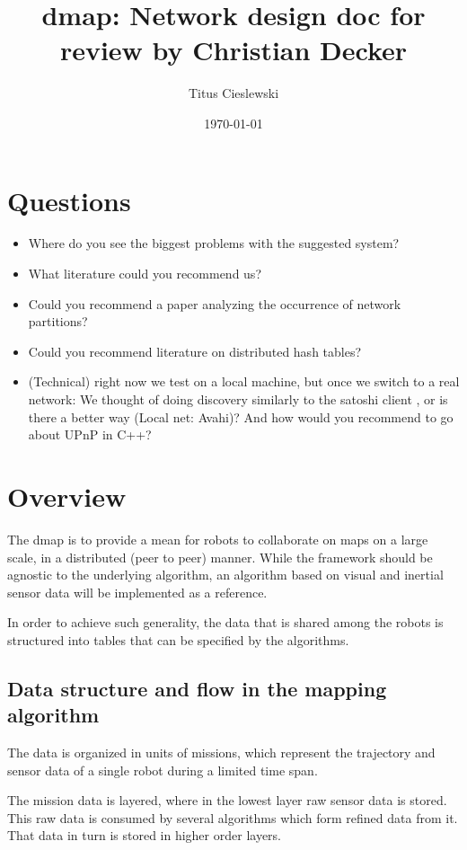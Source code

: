 \documentclass[a4paper, 10pt, conference]{ieeeconf}
\title{dmap: Network design doc for review by Christian Decker}
\author{Titus Cieslewski}
\date{\today}
\begin{document}
\maketitle

\section{Questions}

\begin{itemize}
  \itemsep0em
  \item Where do you see the biggest problems with the suggested system?
  \item What literature could you recommend us?
  \item Could you recommend a paper analyzing the occurrence of network
    partitions?
  \item Could you recommend literature on distributed hash tables?
  \item (Technical) right now we test on a local machine, but once we switch to
    a real network: We thought of doing discovery similarly to the satoshi
    client \cite{discovery}, or is there a better way (Local net: Avahi)? 
    And how would you recommend to go about UPnP in C++?
\end{itemize}

\section{Overview}

The dmap is to provide a mean for robots to collaborate on maps on a large
scale, in a distributed (peer to peer) manner. While the framework should be
agnostic to the underlying algorithm, an algorithm based on visual and inertial
sensor data will be implemented as a reference.

In order to achieve such generality, the data that is shared among the robots is
structured into tables that can be specified by the algorithms.

\subsection{Data structure and flow in the mapping algorithm}

The data is organized in units of missions, which represent the trajectory and
sensor data of a single robot during a limited time span.

The mission data is layered, where in the lowest layer raw sensor data is
stored. This raw data is consumed by several algorithms which form refined data
from it. That data in turn is stored in higher order layers.
\end{document}
